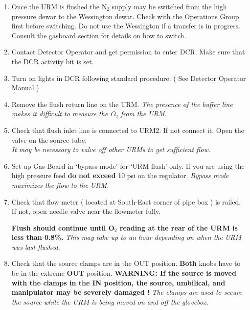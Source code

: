 \begin{enumerate}
\item Once the URM is flushed the N$_2$ supply may be switched from the high
pressure dewar to the Wessington dewar. Check with the Operations Group first
before switching. Do not use the Wessington if a transfer is in progress.
Consult the gasboard section for details on how to switch.


\item\checkbox Contact Detector Operator and get permission to enter DCR. Make sure
that the DCR activity bit is set.
  

\item\checkbox Turn on lights in DCR following standard procedure. ( See Detector Operator 
Manual )

\item\checkbox Remove the flush return line on the URM.
  \small
  {\em The presence of the buffer line makes it difficult to measure the O$_2$ from
the URM.
  }
  \normalsize


  
\item\checkbox Check that flush inlet line is connected to URM2.  If not
  connect it. Open the valve on the source tube.\\
  \small
  {\em It may be necessary to valve off other URMs to get sufficient flow.
  }
  \normalsize

\item\checkbox Set up Gas Board in `bypass mode' for `URM flush' only. If you are
using the high pressure feed {\bf do not exceed } 10 psi on the regulator.
  \small
  {\em Bypass mode maximizes the flow to the URM.
  }
  \normalsize

\item\checkbox Check that flow meter ( located at South-East corner of
pipe box ) is railed. If not, open needle valve near the flowmeter fully.

   {\bf Flush should continue until O$_2$ reading at the rear of the URM is less than 0.8\%.}
   \small
   {\em
     This may take up to an hour depending on when the URM was last
     flushed.
   }
   \normalsize



\item\checkbox Check that the source clamps are in the OUT position.  
{\bf Both } knobs have to be in the extreme {\bf OUT} position. 
{\bf 
     WARNING:  If the source is moved with the clamps in the {\bf IN} position,
       the source, umbilical,
     and manipulator may be severely damaged ! 
   }
  \small
  {\em
   The clamps are used to secure the source while the URM is being moved
   on and off the glovebox.
  }
  \normalsize



\end{enumerate}
